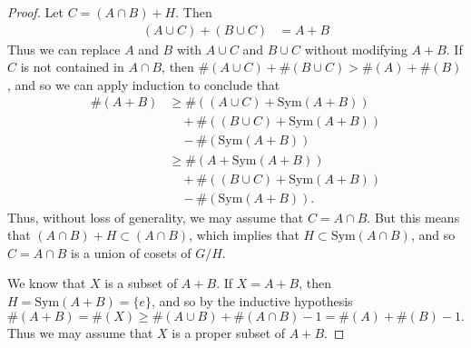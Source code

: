 \begin{proof}
    Let $C = (A \cap B) + H$. Then
    \begin{align*}
        (A \cup C) + (B \cup C) &= A + B
    \end{align*}
    Thus we can replace $A$ and $B$ with $A \cup C$ and $B \cup C$ without modifying $A + B$. If $C$ is not contained in $A \cap B$, then $\#(A \cup C) + \#(B \cup C) > \#(A) + \#(B)$, and so we can apply induction to conclude that
    \begin{align*}
        \#(A + B) &\geq \#((A \cup C) + \text{Sym}(A + B))\\
        &\quad + \#((B \cup C) + \text{Sym}(A + B))\\
        &\quad - \#(\text{Sym}(A + B))\\
        &\geq \#(A + \text{Sym}(A + B))\\
        &\quad + \#((B \cup C) + \text{Sym}(A + B))\\
        &\quad - \#(\text{Sym}(A + B)).
    \end{align*}
    Thus, without loss of generality, we may assume that $C = A \cap B$. But this means that $(A \cap B) + H \subset (A \cap B)$, which implies that $H \subset \text{Sym}(A \cap B)$, and so $C = A \cap B$ is a union of cosets of $G/H$.

    We know that $X$ is a subset of $A + B$. If $X = A + B$, then $H = \text{Sym}(A + B) = \{ e \}$, and so by the inductive hypothesis
    \[ \#(A + B) = \#(X) \geq \#(A \cup B) + \#(A \cap B) - 1 = \#(A) + \#(B) - 1. \]
    Thus we may assume that $X$ is a proper subset of $A + B$.


\end{proof}
